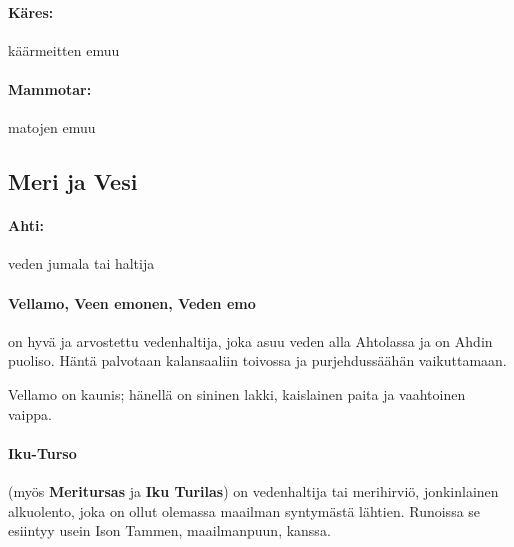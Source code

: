     \paragraph{Käres:} käärmeitten emuu
    \paragraph{Mammotar:} matojen emuu


\subsection{Meri ja Vesi}

  \paragraph{Ahti:} veden jumala tai haltija
  \paragraph{Vellamo, Veen emonen, Veden emo} on hyvä ja arvostettu vedenhaltija, joka asuu veden
    alla Ahtolassa ja on Ahdin puoliso. Häntä palvotaan kalansaaliin toivossa ja purjehdussäähän
    vaikuttamaan.
    \par
    Vellamo on kaunis; hänellä on sininen lakki, kaislainen paita ja vaahtoinen vaippa.
  \paragraph{Iku-Turso} (myös \textbf{Meritursas} ja \textbf{Iku Turilas}) on vedenhaltija tai
    merihirviö, jonkinlainen alkuolento, joka on ollut olemassa maailman syntymästä lähtien.
    Runoissa se esiintyy usein Ison Tammen, maailmanpuun, kanssa.
